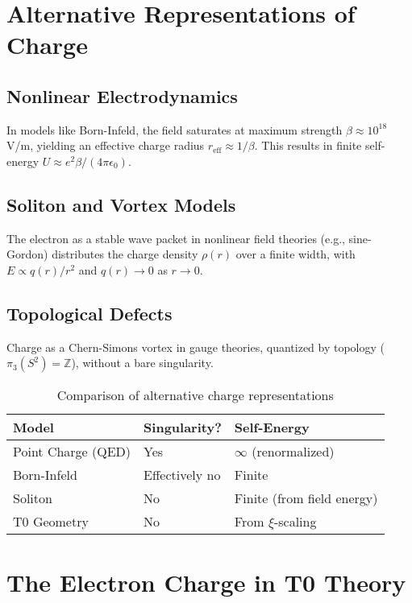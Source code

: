 \documentclass[12pt,a4paper]{article}
\begin{document}
	\section{Alternative Representations of Charge}
	\label{sec:alternatives}
	
	\subsection{Nonlinear Electrodynamics}
	In models like Born-Infeld, the field saturates at maximum strength $\beta \approx 10^{18}$ V/m, yielding an effective charge radius $r_{\text{eff}} \approx 1/\beta$. This results in finite self-energy $U \approx e^2 \beta / (4\pi \epsilon_0)$.
	
	\subsection{Soliton and Vortex Models}
	The electron as a stable wave packet in nonlinear field theories (e.g., sine-Gordon) distributes the charge density $\rho(r)$ over a finite width, with $E \propto q(r)/r^2$ and $q(r) \to 0$ as $r \to 0$.
	
	\subsection{Topological Defects}
	Charge as a Chern-Simons vortex in gauge theories, quantized by topology ($\pi_3(S^2) = \mathbb{Z}$), without a bare singularity.
	
	\begin{table}[h]
		\centering
		\begin{tabular}{lll}
			\toprule
			\textbf{Model} & \textbf{Singularity?} & \textbf{Self-Energy} \\
			\midrule
			Point Charge (QED) & Yes & $\infty$ (renormalized) \\
			Born-Infeld & Effectively no & Finite \\
			Soliton & No & Finite (from field energy) \\
			T0 Geometry & No & From $\xi$-scaling \\
			\bottomrule
		\end{tabular}
		\caption{Comparison of alternative charge representations}
		\label{tab:comparison}
	\end{table}
	
	\section{The Electron Charge in T0 Theory}
	\label{sec:t0-charge}
	
\end{document}
